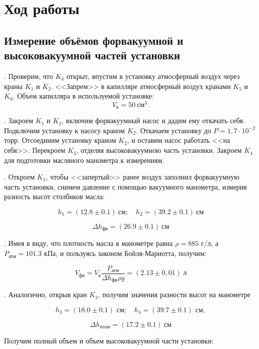 \documentclass[a4paper,12pt]{article} %
\begin{document}
\medskip

\section{Ход работы}

\subsection*{Измерение объёмов форвакуумной и высоковакуумной частей установки}

. Проверим, что $K_4$ открыт, впустим в установку атмосферный воздух через краны $K_1$ и $K_2$. <<Запрем>> в капилляре атмосферный воздух кранами $K_5$ и $K_6$. Объем капилляра в используемой установке: $$V_\text{к} = 50~ \text{см}^3.$$

. Закроем $K_1$ и $K_2$, включим форвакуумный насос и дадим ему откачать себя. Подключим установку к насосу краном $K_2$. Откачаем установку до $P = 1,7 \cdot 10^{-2}$ торр. Отсоединим установку краном $K_2$, и оставим насос работать <<на себя>>. Перекроем  $K_3$, отделяя высоковакуумною часть установки. Закроем $K_4$ для подготовки масляного манометра к измерениям.

\medskip

. Откроем  $K_5$, чтобы <<запертый>> ранее воздух заполнил форвакуумную часть установки, снимем давление с помощью вакуумного манометра, измерив разность высот столбиков масла:

$$ h_1 = (12.8\pm0.1) ~\text{см};\quad h_2 = (39.2\pm0.1) ~\text{см}$$
		
$$\Delta h_\text{фв} = (26.9\pm0.1) ~\text{см}$$	

\medskip

. Имея в виду, что плотность масла в манометре равна $ \rho = 885 \text{ г/л}$, а $P_\text{атм} = 101.3 \text{ кПа}$, и пользуясь законом Бойля-Мариотта, получим:

$$ V_\text{фв} = V_\text{к} \frac{P_\text{атм}}{\Delta h_\text{фв} \rho g} = (2.13\pm0,01)~\text{л} $$

. Аналогично, открыв кран $K_3$, получим значения разности высот на манометре

$$h_3 = (18.0\pm0.1) \text{ см};\quad h_4 = (39.7\pm0.1) \text{ см},$$

$$\Delta h_\text{полн} = (17.2\pm0.1) ~\text{см}$$
		
\noindent Получим полный объем и объем высоковакуумной части установки:
\end{document}

